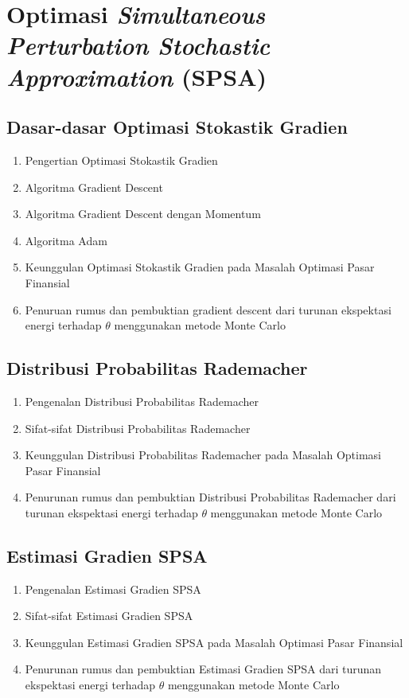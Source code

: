 \section{Optimasi \textit{Simultaneous Perturbation Stochastic Approximation} (SPSA)}

\subsection{Dasar-dasar Optimasi Stokastik Gradien}
\begin{enumerate}
    \item Pengertian Optimasi Stokastik Gradien
    \item Algoritma Gradient Descent
    \item Algoritma Gradient Descent dengan Momentum
    \item Algoritma Adam
    \item Keunggulan Optimasi Stokastik Gradien pada Masalah Optimasi Pasar Finansial
    \item Penuruan rumus dan pembuktian gradient descent dari turunan ekspektasi energi terhadap $\theta$ menggunakan metode Monte Carlo
\end{enumerate}

\subsection{Distribusi Probabilitas Rademacher}
\begin{enumerate}
    \item Pengenalan Distribusi Probabilitas Rademacher
    \item Sifat-sifat Distribusi Probabilitas Rademacher
    \item Keunggulan Distribusi Probabilitas Rademacher pada Masalah Optimasi Pasar Finansial
    \item Penurunan rumus dan pembuktian Distribusi Probabilitas Rademacher dari turunan ekspektasi energi terhadap $\theta$ menggunakan metode Monte Carlo
\end{enumerate}

\subsection{Estimasi Gradien SPSA}
\begin{enumerate}
    \item Pengenalan Estimasi Gradien SPSA
    \item Sifat-sifat Estimasi Gradien SPSA
    \item Keunggulan Estimasi Gradien SPSA pada Masalah Optimasi Pasar Finansial
    \item Penurunan rumus dan pembuktian Estimasi Gradien SPSA dari turunan ekspektasi energi terhadap $\theta$ menggunakan metode Monte Carlo
\end{enumerate}

